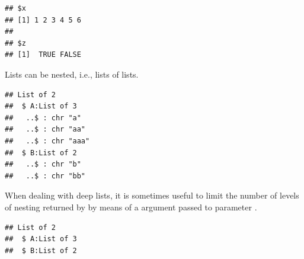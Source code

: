 \documentclass[krantz2]{krantz}\usepackage{knitr}
\begin{document}
\begin{knitrout}\footnotesize
{}\color{fgcolor}\begin{kframe}
\begin{alltt}
\hlopt{$} \hlkwb{<-} 
\end{alltt}
\begin{verbatim}
## $x
## [1] 1 2 3 4 5 6
## 
## $z
## [1]  TRUE FALSE
\end{verbatim}
\end{kframe}
\end{knitrout}

Lists can be nested, i.e., lists of lists.

\begin{knitrout}\footnotesize
{}\color{fgcolor}\begin{kframe}
\begin{alltt}
 \hlkwb{<-} \hlstd{(}\hlstd{,} \hlstd{,} \hlstd{)}
 \hlkwb{<-} \hlstd{(}\hlstd{,} \hlstd{)}
 \hlkwb{<-} \hlstd{(}   
\end{alltt}
\begin{verbatim}
## List of 2
##  $ A:List of 3
##   ..$ : chr "a"
##   ..$ : chr "aa"
##   ..$ : chr "aaa"
##  $ B:List of 2
##   ..$ : chr "b"
##   ..$ : chr "bb"
\end{verbatim}
\end{kframe}
\end{knitrout}

\begin{explainbox}
When dealing with deep lists, it is sometimes useful to limit the number of levels of nesting returned by  by means of a  argument passed to parameter .

\begin{knitrout}\footnotesize
{}\color{fgcolor}\begin{kframe}
\begin{alltt}
  \hlstd{=} \hlstd{)}
\end{alltt}
\begin{verbatim}
## List of 2
##  $ A:List of 3
##  $ B:List of 2
\end{verbatim}
\end{kframe}
\end{knitrout}

\end{explainbox}
\end{document}
